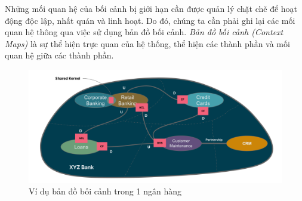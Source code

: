 Những mối quan hệ của bối cảnh bị giới hạn cần được quản lý chặt chẽ để hoạt động độc lập, nhất quán và linh hoạt. Do đó, chúng ta cần phải ghi lại các mối quan hệ thông qua việc sử dụng bản đồ bối cảnh. \emph{Bản đồ bối cảnh (Context Maps)} là sự thể hiện trực quan của hệ thống, thể hiện các thành phần và mối quan hệ giữa các thành phần.

\begin{figure}[H]

    \centering

    \includegraphics[scale = 0.4]{pictures/_vi_du_ban_do_boi_canh_trong_1_ngan_hang/main.drawio.png}

    \caption{Ví dụ bản đồ bối cảnh trong 1 ngân hàng}

\end{figure}


